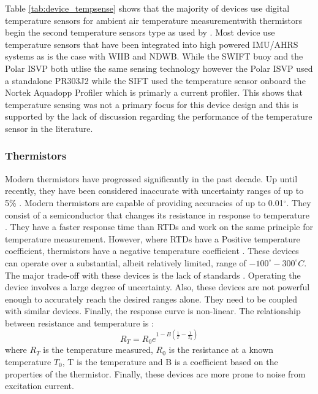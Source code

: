 Table \ref{tab:device_tempsense} shows that the majority of devices use digital temperature sensors for ambient air temperature measurementwith thermistors begin the second temperature sensors type as used by \textcite{thomson2012wave}. Most device use temperature sensors that have been integrated into high powered IMU/AHRS systems as is the case with WIIB and NDWB. While the SWIFT buoy and the Polar ISVP both utlise the same sensing technology however the Polar ISVP used a standalone PR303J2 while the SIFT used the temperature sensor onboard the Nortek Aquadopp Profiler which is primarly a current profiler. This shows that temperature sensing was not a primary focus for this device design and this is supported by the lack of discussion regarding the performance of the temperature sensor in the literature.
\subsubsection{Thermistors}

Modern thermistors have progressed significantly in the past decade. Up until recently, they have been considered inaccurate with uncertainty ranges of up to 5\% \cite{tong2001improving}. Modern thermistors are capable of providing accuracies of up to 0.01$^\circ$. They consist of a semiconductor that changes its resistance in response to temperature \cite{childs2000review}. They have a faster response time than RTDs and work on the same principle for temperature measurement. However, where RTDs have a Positive temperature coefficient, thermistors have a negative temperature coefficient \cite{tong2001improving}. These devices can operate over a substantial, albeit relatively limited, range of $-100^\circ - 300^\circ C$. The major trade-off with these devices is the lack of standards \cite{tong2001improving}. Operating the device involves a large degree of uncertainty. Also, these devices are not powerful enough to accurately reach the desired ranges alone. They need to be coupled with similar devices. Finally, the response curve is non-linear. The  relationship between resistance and temperature is \cite{childs2000review}:
\begin{equation}
	R_T = R_0e^{1 - B(\frac{1}{T}- \frac{1}{T_0})}
\end{equation}
where $R_T$ is the temperature measured, $R_0$ is the resistance at a known temperature $T_0$, T is the temperature and B is a coefficient based on the properties of the thermistor. Finally, these devices are more prone to noise from excitation current.

